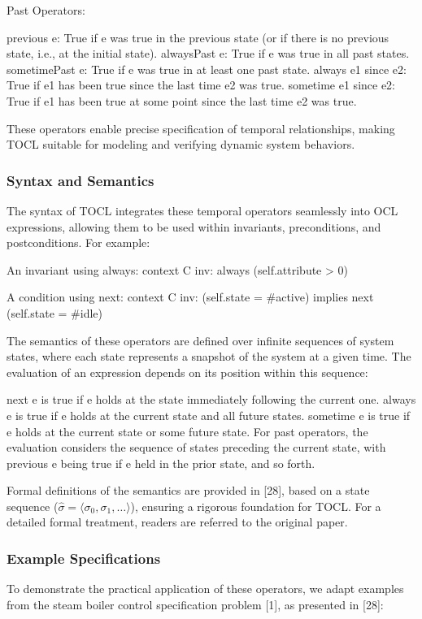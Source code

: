 Past Operators:

previous e: True if e was true in the previous state (or if there is no previous state, i.e., at the initial state).
alwaysPast e: True if e was true in all past states.
sometimePast e: True if e was true in at least one past state.
always e1 since e2: True if e1 has been true since the last time e2 was true.
sometime e1 since e2: True if e1 has been true at some point since the last time e2 was true.

These operators enable precise specification of temporal relationships, making TOCL suitable for modeling and verifying dynamic system behaviors.

%
\subsubsection{Syntax and Semantics}
The syntax of TOCL integrates these temporal operators seamlessly into OCL expressions, allowing them to be used within invariants, preconditions, and postconditions. For example:

An invariant using always:
context C inv:
  always (self.attribute > 0)


A condition using next:
context C inv:
  (self.state = \#active) implies next (self.state = \#idle)

The semantics of these operators are defined over infinite sequences of system states, where each state represents a snapshot of the system at a given time. The evaluation of an expression depends on its position within this sequence:

next e is true if e holds at the state immediately following the current one.
always e is true if e holds at the current state and all future states.
sometime e is true if e holds at the current state or some future state.
For past operators, the evaluation considers the sequence of states preceding the current state, with previous e being true if e held in the prior state, and so forth.

Formal definitions of the semantics are provided in [28], based on a state sequence ($\hat{\sigma} = \langle \sigma_0, \sigma_1, \ldots \rangle$), ensuring a rigorous foundation for TOCL. For a detailed formal treatment, readers are referred to the original paper.

%
\subsubsection{Example Specifications}
To demonstrate the practical application of these operators, we adapt examples 
from the steam boiler control specification problem [1], as presented in [28]:

